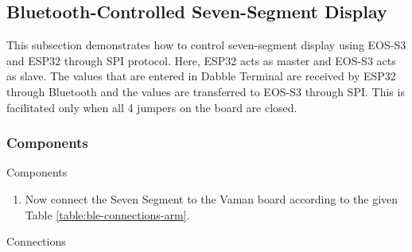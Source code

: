 \subsection{Bluetooth-Controlled Seven-Segment Display}
This subsection demonstrates how to control seven-segment display using EOS-S3 and
ESP32 through SPI protocol. Here, ESP32 acts as master and EOS-S3 acts as slave.
The values that are entered in Dabble Terminal are received by ESP32 through
Bluetooth and the values are transferred to EOS-S3 through SPI. This is 
facilitated only when all 4 jumpers on the board are closed.
\subsubsection{Components}

\begin{table}[!ht]
\centering

\caption{Components}
\label{table:ble-components-arm}
\end{table}
\begin{enumerate}
\item Now connect the Seven Segment to the Vaman board according to the given 
Table \autoref{table:ble-connections-arm}.
\end{enumerate}
\begin{table}[!ht]
\centering

\caption{Connections}
\label{table:ble-connections-arm}
\end{table}

